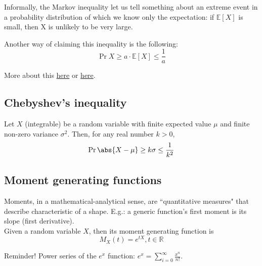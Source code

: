 	Informally, the Markov inequality let us tell something about an extreme event in a probability distribution of which we know only the expectation: if $\mathbb{E}[X]$ is small, then X is unlikely to be very large.
    
    Another way of claiming this inequality is the following:
    \begin{equation}\label{eq:markov2}
        \Pr{X \geq a \cdot \mathbb{E}[X]} \leq \frac{1}{a}
    \end{equation}
	
	More about this \href{https://youtu.be/vjYanZ1nsZg}{here} or \href{https://ocw.mit.edu/resources/res-6-012-introduction-to-probability-spring-2018/part-i-the-fundamentals/}{here}.


\subsection{Chebyshev's inequality}

    Let $X$ (integrable) be a random variable with finite expected value $\mu$ and finite non-zero variance $\sigma^2$. Then, for any real number $k > 0$,
    \begin{equation}\label{eq:chebyshev}
        \Pr{\abs{X-\mu} \geq k \sigma} \leq \frac{1}{k^2}
    \end{equation}


\subsection{Moment generating functions}
	
	Moments, in a mathematical-analytical sense, are ``quantitative measures" that describe characteristic of a shape. E.g.: a generic function's first moment is its slope (first derivative).\\
	Given a random variable $X$, then its moment generating function is
	\begin{equation}
	M_X(t) = e^{tX}, t \in \mathbb{R}
	\end{equation}
	
	
	Reminder! Power series of the $e^x$ function: $\displaystyle e^x = \sum_{i=0}^{\infty}\frac{x^n}{n!}$.
